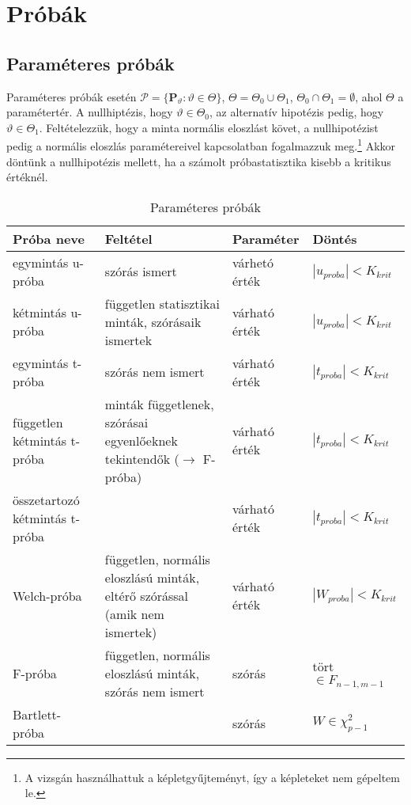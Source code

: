 \chapter{Próbák}

\section{Paraméteres próbák}

Paraméteres próbák esetén $\mathcal{P} = \{ \mathbf{P}_\vartheta : \vartheta \in \Theta\}$, $\Theta = \Theta_0 \cup \Theta_1$, $\Theta_0 \cap \Theta_1 = \emptyset$, ahol $\Theta$ a paramétertér. A nullhiptézis, hogy $\vartheta \in \Theta_0$, az alternatív hipotézis pedig, hogy $\vartheta \in \Theta_1$. Feltételezzük, hogy a minta normális eloszlást követ, a nullhipotézist pedig a normális eloszlás paramétereivel kapcsolatban fogalmazzuk meg.\footnote{A vizsgán használhattuk a képletgyűjteményt, így a képleteket nem gépeltem le.} Akkor döntünk a nullhipotézis mellett, ha a számolt próbastatisztika kisebb a kritikus értéknél.

\begin{table}[h]
\centering
\caption{Paraméteres próbák}
\label{tab:param}
\begin{tabular}{|p{}|p{5cm}|p{3cm}|p{3cm}|}
\hline
\textbf{Próba neve}            & \textbf{Feltétel}                                                             & Paraméter & Döntés                   \\ \hline
egymintás u-próba              & szórás ismert & várhetó érték & $|u_{proba}| < K_{krit}$ \\ \hline
kétmintás u-próba              & független statisztikai minták, szórásaik ismertek & várható érték & $|u_{proba}| < K_{krit}$ \\ \hline
egymintás t-próba              & szórás nem ismert & várható érték &  $|t_{proba}| < K_{krit}$ \\ \hline
független kétmintás t-próba    & minták függetlenek, szórásai egyenlőeknek tekintendők ($\rightarrow$ F-próba) & várható érték &  $|t_{proba}| < K_{krit}$ \\ \hline
összetartozó kétmintás t-próba & & várható érték &  $|t_{proba}| < K_{krit}$ \\ \hline
Welch-próba                    & független, normális eloszlású minták, eltérő szórással (amik nem ismertek) & várható érték &  $|W_{proba}| < K_{krit}$ \\ \hline
F-próba                        & független, normális eloszlású minták, szórás nem ismert & szórás &  tört $\in F_{n-1,m-1}$   \\ \hline
Bartlett-próba                        &  & szórás & $W \in \chi^2_{p-1}$   \\ \hline
\end{tabular}
\end{table}

